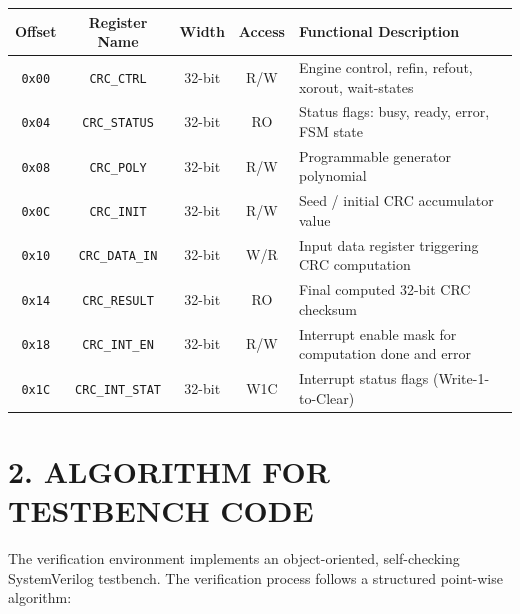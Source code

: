 \documentclass[11pt,a4paper,twoside]{article}
\begin{document}
\begin{center}
\scriptsize
\begin{tabular}{|c|c|c|c|l|}
\hline
\textbf{Offset} & \textbf{Register Name} & \textbf{Width} & \textbf{Access} & \textbf{Functional Description} \\
\hline
\texttt{0x00} & \texttt{CRC\_CTRL}     & 32-bit & R/W & Engine control, refin, refout, xorout, wait-states \\
\texttt{0x04} & \texttt{CRC\_STATUS}   & 32-bit & RO  & Status flags: busy, ready, error, FSM state \\
\texttt{0x08} & \texttt{CRC\_POLY}     & 32-bit & R/W & Programmable generator polynomial \\
\texttt{0x0C} & \texttt{CRC\_INIT}     & 32-bit & R/W & Seed / initial CRC accumulator value \\
\texttt{0x10} & \texttt{CRC\_DATA\_IN} & 32-bit & W/R & Input data register triggering CRC computation \\
\texttt{0x14} & \texttt{CRC\_RESULT}   & 32-bit & RO  & Final computed 32-bit CRC checksum \\
\texttt{0x18} & \texttt{CRC\_INT\_EN}  & 32-bit & R/W & Interrupt enable mask for computation done and error \\
\texttt{0x1C} & \texttt{CRC\_INT\_STAT}& 32-bit & W1C & Interrupt status flags (Write-1-to-Clear) \\
\hline
\end{tabular}
\end{center}

\clearpage

\section*{2. ALGORITHM FOR TESTBENCH CODE}

The verification environment implements an object-oriented, self-checking SystemVerilog testbench. The verification process follows a structured point-wise algorithm:
\end{document}
